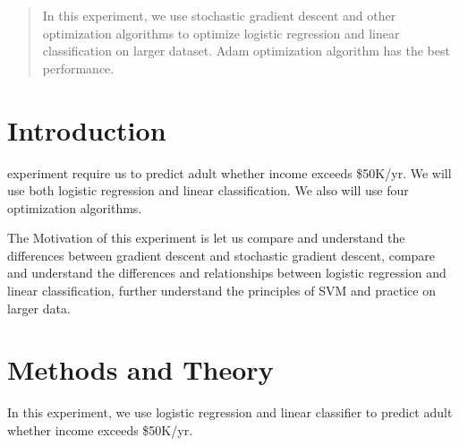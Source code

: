 \documentclass[journal, a4paper]{IEEEtran}
\begin{document}
\begin{abstract}
    In this experiment, we use stochastic gradient descent and other optimization algorithms to optimize logistic regression and linear classification on larger dataset. Adam optimization algorithm has the best performance.
\end{abstract}

\section{Introduction}
 experiment require us to predict adult whether income exceeds \$50K/yr. We will use both logistic regression and linear classification. We also will use four optimization algorithms.

The Motivation of this experiment is let us compare and understand the differences between gradient descent and stochastic gradient descent, compare and understand the differences and relationships between logistic regression and linear classification, further understand the principles of SVM and practice on larger data.




\section{Methods and Theory}
In this experiment, we use logistic regression and linear classifier to predict adult whether income exceeds \$50K/yr.
\end{document}
